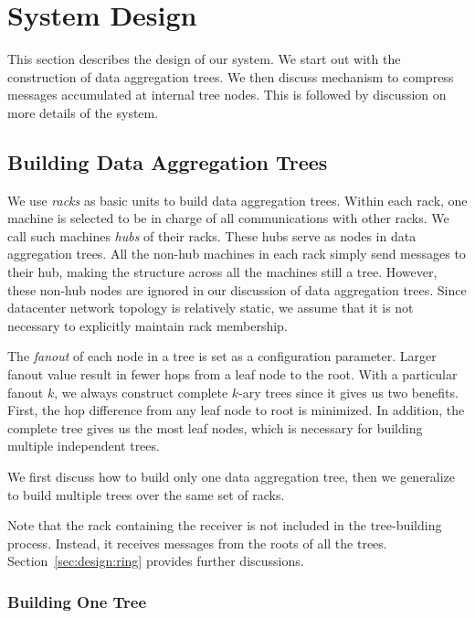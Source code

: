 \section{System Design}\label{sec:design}

This section describes the design of our system.  We start out with the
construction of data aggregation trees.  We then discuss mechanism to compress
messages accumulated at internal tree nodes.  This is followed by discussion on
more details of the system.

\subsection{Building Data Aggregation Trees}

We use \emph{racks} as basic units to build data aggregation trees.  Within
each rack, one machine is selected to be in charge of all communications with
other racks.  We call such machines \emph{hubs} of their racks.  These hubs
serve as nodes in data aggregation trees. All the non-hub machines in each rack
simply send messages to their hub, making the structure across all the machines
still a tree.  However, these non-hub nodes are ignored in our discussion of
data aggregation trees.  Since datacenter network topology is relatively
static, we assume that it is not necessary to explicitly maintain rack
membership.

The \emph{fanout} of each node in a tree is set as a configuration parameter.
Larger fanout value result in fewer hops from a leaf node to the root.  With a
particular fanout $k$, we always construct complete $k$-ary trees since it
gives us two benefits.  First, the hop difference from any leaf node to root is
minimized.  In addition, the complete tree gives us the most leaf nodes, which
is necessary for building multiple independent trees.

We first discuss how to build only one data aggregation tree, then we
generalize to build multiple trees over the same set of racks.

Note that the rack containing the receiver is not included in the tree-building
process.  Instead, it receives messages from the roots of all the trees.
Section~\ref{sec:design:ring} provides further discussions.

\subsubsection*{Building One Tree}

